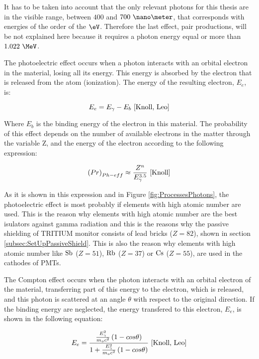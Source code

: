 It has to be taken into account that the only relevant photons for this thesis are in the visible range, between $400$ and $700~\nano\meter$, that corresponds with energies of the order of the $\eV$. Therefore the last effect, pair productions, will be not explained here because it requires a photon energy equal or more than $1.022~\MeV$.

The photoelectric effect occurs when a photon interacts with an orbital electron in the material, losing all its energy. This energy is absorbed by the electron that is released from the atom (ionization). The energy of the resulting electron, $E_e$, is:


\begin{equation}
E_e = E_\gamma - E_b ~\cite{Knoll, Leo}
\label{eq:PhotoelectricEffect}
\end{equation}

Where $E_b$ is the binding energy of the electron in this material. The probability of this effect depends on the number of available electrons in the matter through the variable Z, and the energy of the electron according to the following expression:

\begin{equation}
\left(Pr\right)_{Ph-eff} \approx \frac{Z^n}{E_\gamma^{3.5}}~\cite{Knoll}
\label{eq:PhotoelectricProb}
\end{equation}

As it is shown in this expression and in Figure \ref{fig:ProcessesPhotons}, the photoelectric effect is most probably if elements with high atomic number are used. This is the reason why elements with high atomic number are the best isulators against gamma radiation and this is the reasons why the passive shielding of TRITIUM monitor consists of lead bricks ($Z=82$), shown in section \ref{subsec:SetUpPassiveShield}. This is also the reason why elements with high atomic number like $\ce{Sb}$ ($Z=51$), $\ce{Rb}$ ($Z=37$) or $\ce{Cs}$ ($Z=55$), are used in the cathodes of PMTs. 

The Compton effect occurs when the photon interacts with an orbital electron of the material, transferring part of this energy to the electron, which is released, and this photon is scattered at an angle $\theta$ with respect to the original direction. If the binding energy are neglected, the energy transfered to this electron, $E_e$, is shown in the following equation:

\begin{equation}
E_e=\frac{\frac{E_\gamma^2}{m_oc^2}\left(1-cos\theta\right)}{1+ \frac{E_\gamma^2}{m_oc^2}\left(1-cos\theta\right)}~\cite{Knoll, Leo}
\label{eq:ComptonEffect}
\end{equation}

